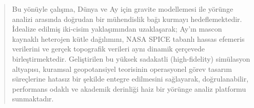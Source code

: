 \documentclass[12pt, a4paper]{book}
\begin{document}
\begin{abstract}
\medskip
Bu yönüyle çalışma, Dünya ve Ay için gravite modellemesi ile yörünge analizi arasında doğrudan bir mühendislik 
bağı kurmayı hedeflemektedir. İdealize edilmiş iki-cisim yaklaşımından uzaklaşarak; Ay’ın mascon kaynaklı 
heterojen kütle dağılımını, NASA SPICE tabanlı hassas efemeris verilerini ve gerçek topografik verileri aynı 
dinamik çerçevede birleştirmektedir. Geliştirilen bu yüksek sadakatli (high-fidelity) simülasyon altyapısı, kuramsal 
geopotansiyel teorisinin operasyonel görev tasarım süreçlerine hatasız bir şekilde entegre edilmesini sağlayarak, 
doğrulanabilir, performans odaklı ve akademik derinliği haiz bir yörünge analiz platformu sunmaktadır.
\end{abstract}


\cleardoublepage



\tableofcontents

















\cleardoublepage
{}
{}
\printbibliography[title={Kaynakça}]
\end{document}
